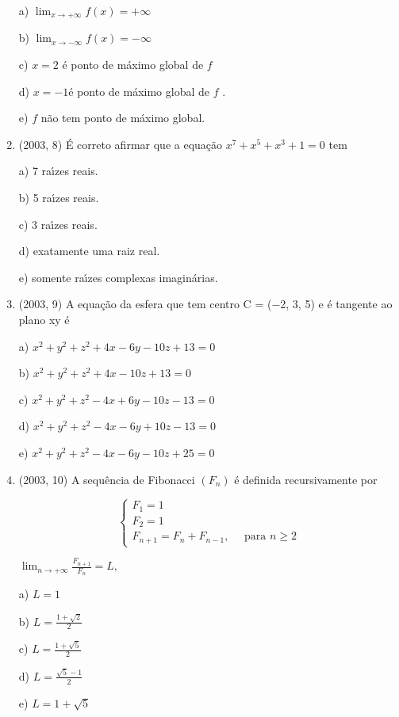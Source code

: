 \documentclass{article}
\begin{document}
\begin{enumerate}
a) $\lim _{x \rightarrow+\infty} f(x)=+\infty$

b) $\lim _{x \rightarrow-\infty} f(x)=-\infty$

c) $x=2$ é ponto de máximo global de $f$

d) $x=-1 é$ ponto de máximo global de $f$ .

e) $f$ não tem ponto de máximo global.\newline


\item(2003, 8) É correto afirmar que a equação $x^{7}+x^{5}+x^{3}+1=0$ tem 

a) 7 raı́zes reais.

b) 5 raı́zes reais.

c) 3 raı́zes reais.

d) exatamente uma raiz real.

e) somente raı́zes complexas imaginárias.\newline

\item(2003, 9) A equação da esfera que tem centro C = (−2, 3, 5) e é tangente ao plano xy é

a) $x^{2}+y^{2}+z^{2}+4 x-6 y-10 z+13=0$

b) $x^{2}+y^{2}+z^{2}+4 x-10 z+13=0$

c) $x^{2}+y^{2}+z^{2}-4 x+6 y-10 z-13=0$

d) $x^{2}+y^{2}+z^{2}-4 x-6 y+10 z-13=0$

e) $x^{2}+y^{2}+z^{2}-4 x-6 y-10 z+25=0$\newline


\item(2003, 10) A sequência de Fibonacci $\left(F_{n}\right)$ é definida recursivamente por 

$$\left\{\begin{array}{l}{F_{1}=1} \\ {F_{2}=1} \\ {F_{n+1}=F_{n}+F_{n-1}, \quad \text { para } n \geq 2}\end{array}\right.$$

$\lim _{n \rightarrow+\infty} \frac{F_{n+1}}{F_{n}}=L,$

a) $L=1$

b) $L=\frac{1+\sqrt{2}}{2}$

c) $L=\frac{1+\sqrt{5}}{2}$

d) $L=\frac{\sqrt{5}-1}{2}$

e) $L=1+\sqrt{5}$ \newline



\end{enumerate}
\end{document}
